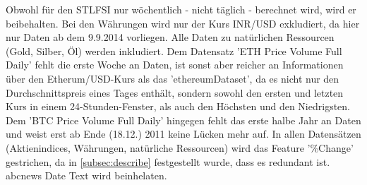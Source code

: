 Obwohl für den STLFSI nur wöchentlich - nicht täglich - berechnet wird, wird er beibehalten. Bei den Währungen wird nur der Kurs INR/USD exkludiert, da hier nur Daten ab dem 9.9.2014 vorliegen. Alle Daten zu natürlichen Ressourcen (Gold, Silber, Öl) werden inkludiert.
Dem Datensatz 'ETH \textunderscore Price \textunderscore Volume \textunderscore Full \textunderscore Daily' fehlt die erste Woche an Daten, ist sonst aber reicher an Informationen über den Etherum/USD-Kurs als das 'ethereumDataset', da es nicht nur den Durchschnittspreis eines Tages enthält, sondern sowohl den ersten und letzten Kurs in einem 24-Stunden-Fenster, als auch den Höchsten und den Niedrigsten. Dem 'BTC \textunderscore Price \textunderscore Volume \textunderscore Full \textunderscore Daily' hingegen fehlt das erste halbe Jahr an Daten und weist erst ab Ende (18.12.) 2011 keine Lücken mehr auf. In allen Datensätzen (Aktienindices, Währungen, natürliche Ressourcen) wird das Feature '\%Change' gestrichen, da in \ref{subsec:describe} festgestellt wurde, dass es redundant ist.
abcnews \textunderscore Date \textunderscore Text wird beinhelaten.

